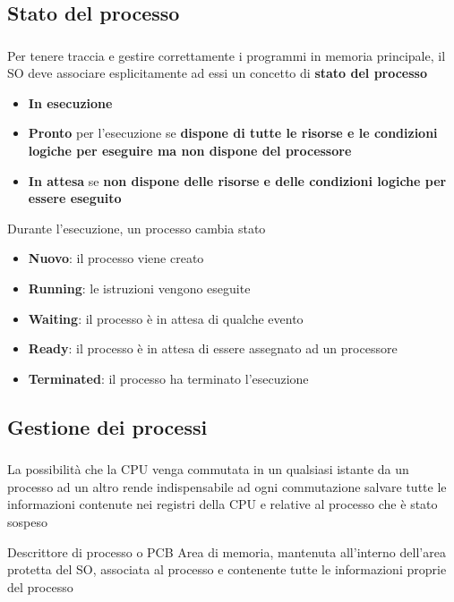 \documentclass{beamer}
\newenvironment{mainframe}{
	\begin{frame}
		\frametitle{\insertsubsection}
		\framesubtitle{\insertsection}
	}{
	\end{frame}
}
\begin{document}
\subsection{Stato del processo}
\begin{mainframe}
	Per tenere traccia e gestire correttamente i programmi in memoria principale, il SO deve associare esplicitamente ad essi un concetto di \textbf{stato del processo}
	\begin{itemize}
		\item \textbf{In esecuzione}
		\item \textbf{Pronto} per l'esecuzione se \textbf{dispone di tutte le risorse e le condizioni logiche per eseguire ma non dispone del processore}
		\item \textbf{In attesa} se \textbf{non dispone delle risorse e delle condizioni logiche per essere eseguito}
	\end{itemize}
\end{mainframe}
\begin{frame}
	Durante l'esecuzione, un processo cambia stato
	\begin{itemize}
		\item \textbf{Nuovo}: il processo viene creato
		\item \textbf{Running}: le istruzioni vengono eseguite
		\item \textbf{Waiting}: il processo è in attesa di qualche evento
		\item \textbf{Ready}: il processo è in attesa di essere assegnato ad un processore
		\item \textbf{Terminated}: il processo ha terminato l'esecuzione
	\end{itemize}
\end{frame}
\subsection{Gestione dei processi}
\begin{mainframe}
	La possibilità che la CPU venga commutata in un qualsiasi istante da un processo ad un altro rende indispensabile ad ogni commutazione salvare tutte le informazioni contenute nei registri della CPU e relative al processo che è stato sospeso
	\begin{block}{Descrittore di processo o PCB}
		Area di memoria, mantenuta all'interno dell'area protetta del SO, associata al processo e contenente tutte le informazioni proprie del processo
	\end{block}
\end{mainframe}
\end{document}
